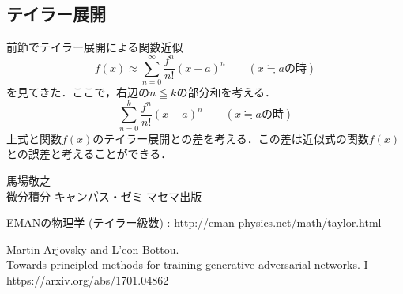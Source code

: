 \documentclass[uplatex, dvipdfmx]{jsarticle}
\theoremstyle{definition}
\begin{document}
    \subsection{テイラー展開}
    前節でテイラー展開による関数近似
    \begin{equation}
        f(x) \approx \sum_{n=0}^{\infty} \frac{f^{n}}{n!} (x-a)^{n} \qquad (x \fallingdotseq a の時)
    \end{equation}
    を見てきた．ここで，右辺の$n \leqq k$の部分和を考える．
    \begin{equation}
       \sum_{n=0}^{k} \frac{f^{n}}{n!} (x-a)^{n} \qquad (x \fallingdotseq a の時)
    \end{equation}
    上式と関数$f(x)$のテイラー展開との差を考える．この差は近似式の関数$f(x)$との誤差と考えることができる．




    
    

    \newpage
    \begin{thebibliography}{10}
        馬場敬之 \\
        微分積分 キャンパス・ゼミ マセマ出版

        EMANの物理学 (テイラー級数) : http://eman-physics.net/math/taylor.html

        Martin Arjovsky and L'eon Bottou. \\
        Towards principled methods for training generative adversarial networks. I \\
        https://arxiv.org/abs/1701.04862
    \end{thebibliography}
    
    
\end{document}
